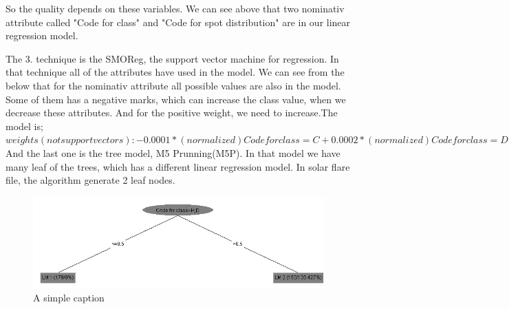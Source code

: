 \documentclass[a4paper]{article}
\begin{document}
So the quality depends on these variables. We can see above that two nominativ attribute called "Code for class" and "Code for spot distribution" are in our linear regression model.

The 3. technique is the SMOReg, the support vector machine for regression. In that technique all of the attributes have used in the model. We can see from the below that for the nominativ attribute all possible values are also in the model. Some of them has a negative marks, which can increase the class value, when we decrease these attributes. And for the positive weight, we need to increase.The model is;\\
$weights (not support vectors):
 -       0.0001 * (normalized) Code for class=C
 +       0.0002 * (normalized) Code for class=D
 +       0.0002 * (normalized) Code for class=B
 +       0      * (normalized) Code for class=F
 +       0.0002 * (normalized) Code for class=H
 -       0.0006 * (normalized) Code for class=E
 -       0.0002 * (normalized) Code for largest spot size=S
 +       0.0004 * (normalized) Code for largest spot size=A
 -       0.0001 * (normalized) Code for largest spot size=K
 +       0.0002 * (normalized) Code for largest spot size=R
 +       0.0002 * (normalized) Code for largest spot size=X
 -       0.0005 * (normalized) Code for largest spot size=H
 +       0.0002 * (normalized) Code for spot distribution=O
 -       0.0007 * (normalized) Code for spot distribution=I
 +       0.0002 * (normalized) Code for spot distribution=X
 +       0.0002 * (normalized) Code for spot distribution=C
 -       0.0006 * (normalized) Activity
 +       0.0003 * (normalized) Evolution
 +       0.0003 * (normalized) Previous 24 hour flare activity code
 +       0.001  * (normalized) Historically-complex
 +       0      * (normalized) Did region become historically complex on this pass across the sun's disk
 +       0.0002 * (normalized) Area
 +       0.0004 * (normalized) Area of the largest spot
 -       0.0007$\\

And the last one is the tree model, M5 Prunning(M5P). In that model we have many leaf of the trees, which has a different linear regression model. In solar flare file, the algorithm generate 2 leaf nodes.

\begin{figure}[ht!]
\centering
\includegraphics[width=120mm]{tree}
\caption{A simple caption}
\label{overflow}
\end{figure}
\end{document}
